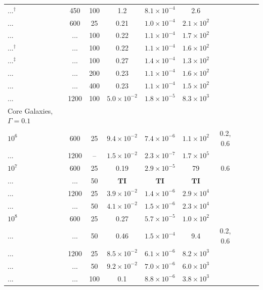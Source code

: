 \documentclass[usenatbib,fleqn]{mn2e}
\begin{document}
\begin{table}
\begin{threeparttable}
\begin{minipage}{18cm}
\begin{tabular}{lccccccccc}
...$^{\dagger}$ & 450 & 100 & 1.2 & $ 8.1 \times 10^{ -4 }$ & 2.6 \\
... & 600 & 25 & 0.21 & $ 1.0 \times 10^{ -4 }$ & $ 2.1 \times 10^{ 2 }$ \\
... & ... & 100 & 0.22 & $ 1.1 \times 10^{ -4 }$ & $ 1.7 \times 10^{ 2
}$ \\
...$^{\dagger}$ & ... & 100 & 0.22 & $ 1.1 \times 10^{ -4 }$ & $ 1.6 \times 10^{ 2 }$ \\
...$^{\ddagger}$  & ... & 100 & 0.27 & $ 1.4 \times 10^{ -4 }$ & $ 1.3 \times 10^{ 2
}$ \\
... & ... & 200 & 0.23 & $ 1.1 \times 10^{ -4 }$ & $ 1.6 \times 10^{ 2 }$ \\
... & ... & 400 & 0.23 & $ 1.1 \times 10^{ -4 }$ & $ 1.5 \times 10^{ 2 }$ \\
... & 1200 & 100 & $ 5.0 \times 10^{ -2 }$ & $ 1.8 \times 10^{ -5 }$ & $ 8.3 \times 10^{ 3 }$ \\
\hline
Core Galaxies, $\Gamma = 0.1$  &  & & & & & & & & \\
$    10^{ 6 }$ & 600 & 25 & $ 9.4 \times 10^{ -2 }$ & $ 7.4 \times
10^{ -6 }$ & $ 1.1 \times 10^{ 2 }$ & 0.2, 0.6\\
... & 1200 & -- & $ 1.5 \times 10^{ -2 }$ & $ 2.3 \times 10^{ -7 }$ & $ 1.7 \times 10^{ 5 }$ \\
$    10^{ 7 }$ & 600 & 25 & 0.19 & $ 2.9 \times 10^{ -5 }$ & 79 & 0.6 \\
... & ... & 50 & $\mathbf{TI}$ & $\mathbf{TI}$ & $\mathbf{TI}$ \\
... & 1200 & 25 & $ 3.9 \times 10^{ -2 }$ & $ 1.4 \times 10^{ -6 }$ & $ 2.9 \times 10^{ 4 }$ \\
 ... & ... & 50 & $ 4.1 \times 10^{ -2 }$ & $ 1.5 \times 10^{ -6 }$ & $ 2.3 \times 10^{ 4 }$ \\
$    10^{ 8 }$ & 600 & 25 & 0.27 & $ 5.7 \times 10^{ -5 }$ &
 $ 1.0 \times 10^{ 2 }$ \\
... & ... & 50 & 0.46 & $ 1.5 \times 10^{ -4 }$ & 9.4 & 0.2, 0.6\\
... & 1200 & 25 & $ 8.5 \times 10^{ -2 }$ & $ 6.1 \times 10^{ -6 }$ & $ 8.2 \times 10^{ 3 }$ \\
... & ... & 50 & $ 9.2 \times 10^{ -2 }$ & $ 7.0 \times 10^{ -6 }$ & $ 6.0 \times 10^{ 3 }$ \\
... & ... & 100 & 0.1 & $ 8.8 \times 10^{ -6 }$ & $ 3.8 \times 10^{ 3 }$ \\

\end{tabular}
\end{minipage}
\end{threeparttable}
\end{table}
\end{document}
